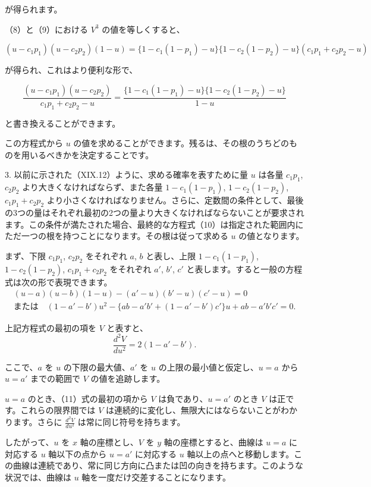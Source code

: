 \documentclass[a4paper,11pt,openany]{ltjsbook}
\begin{document}
が得られます。

（8）と（9）における $V^3$ の値を等しくすると、

\[
(u - c_1 p_1)(u - c_2 p_2)(1 - u) = \{1 - c_1(1 - p_1) - u\}\{1 - c_2(1 - p_2) - u\}(c_1 p_1 + c_2 p_2 - u)
\]

が得られ、これはより便利な形で、

\[
\frac{(u - c_1 p_1)(u - c_2 p_2)}{c_1 p_1 + c_2 p_2 - u} = \frac{\{1 - c_1(1 - p_1) - u\}\{1 - c_2(1 - p_2) - u\}}{1 - u}
\]

と書き換えることができます。

この方程式から $u$ の値を求めることができます。残るは、その根のうちどのものを用いるべきかを決定することです。

3. 以前に示された（XIX.12）ように、求める確率を表すために量 $u$ は各量 $c_1 p_1$, $c_2 p_2$ より大きくなければならず、また各量 $1 - c_1(1 - p_1)$, $1 - c_2(1 - p_2)$, $c_1 p_1 + c_2 p_2$ より小さくなければなりません。さらに、定数間の条件として、最後の3つの量はそれぞれ最初の2つの量より大きくなければならないことが要求されます。この条件が満たされた場合、最終的な方程式（10）は指定された範囲内にただ一つの根を持つことになります。その根は従って求める $u$ の値となります。

まず、下限 $c_1 p_1$, $c_2 p_2$ をそれぞれ $a$, $b$ と表し、上限 $1 - c_1(1 - p_1)$, $1 - c_2(1 - p_2)$, $c_1 p_1 + c_2 p_2$ をそれぞれ $a'$, $b'$, $c'$ と表します。すると一般の方程式は次の形で表現できます。
\begin{gather*}
(u-a)(u-b)(1-u) - (a'-u)(b'-u)(c'-u) = 0 \tag{11}\\
\text{または}\quad (1-a'-b')u^2 - \{ab - a'b' + (1-a'-b')c'\} u + ab - a'b'c' = 0. \tag{11}
\end{gather*}

上記方程式の最初の項を $V$ と表すと、
\begin{equation*}\tag{12}
\frac{d^2 V}{du^2} = 2(1 - a' - b').
\end{equation*}

ここで、$a$ を $u$ の下限の最大値、$a'$ を $u$ の上限の最小値と仮定し、$u = a$ から $u = a'$ までの範囲で $V$ の値を追跡します。

$u = a$ のとき、（11）式の最初の項から $V$ は負であり、$u = a'$ のとき $V$ は正です。これらの限界間では $V$ は連続的に変化し、無限大にはならないことがわかります。さらに $\frac{d^2 V}{du^2}$ は常に同じ符号を持ちます。

したがって、$u$ を $x$ 軸の座標とし、$V$ を $y$ 軸の座標とすると、曲線は $u = a$ に対応する $u$ 軸以下の点から $u = a'$ に対応する $u$ 軸以上の点へと移動します。この曲線は連続であり、常に同じ方向に凸または凹の向きを持ちます。このような状況では、曲線は $u$ 軸を一度だけ交差することになります。
\end{document}
